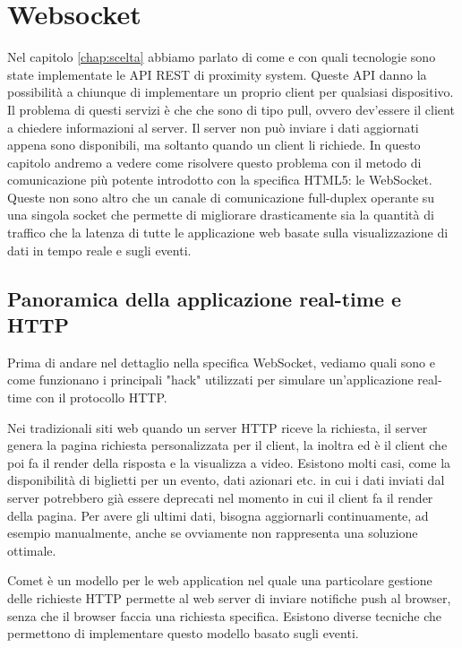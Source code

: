 \chapter{Websocket}
\label{chap:websocket}
\nocite{html5}
Nel capitolo \ref{chap:scelta} abbiamo parlato di come e con quali tecnologie sono state implementate le API REST di proximity system.  
Queste API danno la possibilità a chiunque di implementare un proprio client per qualsiasi dispositivo. 
Il problema di questi servizi è che che sono di tipo pull, ovvero dev'essere il client a chiedere informazioni al server. 
Il server non può inviare i dati aggiornati appena sono disponibili,
ma soltanto quando un client li richiede.
In questo capitolo andremo a vedere come risolvere questo problema con il metodo di comunicazione più potente introdotto con la specifica HTML5: le WebSocket.
Queste non sono altro che un canale di comunicazione full-duplex operante su una singola socket che permette di migliorare drasticamente sia la quantità di traffico che la latenza di tutte le applicazione web basate sulla visualizzazione di dati in tempo reale e sugli eventi.
  
\section{Panoramica della applicazione real-time e HTTP}
\label{sec:real-time}
Prima di andare nel dettaglio nella specifica WebSocket, vediamo quali sono e come funzionano i principali "hack" utilizzati per simulare un'applicazione real-time con il protocollo HTTP.

Nei tradizionali siti web quando un server HTTP riceve la richiesta, il server genera la pagina richiesta personalizzata per il client, la inoltra ed è il client che poi fa il render della risposta e la visualizza a video.
Esistono molti casi, come la disponibilità di biglietti per un evento, dati azionari etc. in cui i dati inviati dal server potrebbero già essere deprecati nel momento in cui il client fa il render della pagina. 
Per avere gli ultimi dati, bisogna aggiornarli continuamente, ad esempio manualmente, anche se ovviamente non rappresenta una soluzione ottimale.

Comet è un modello per le web application nel quale una particolare gestione 
delle richieste HTTP permette al web server di inviare notifiche push al browser, senza che il browser faccia una richiesta specifica.
Esistono diverse tecniche che permettono di implementare questo modello basato sugli eventi. 

